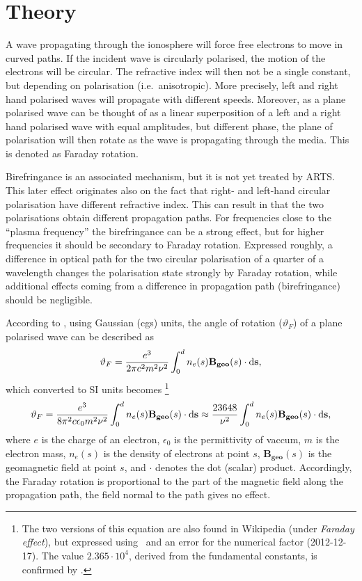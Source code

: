 \section{Theory}
\label{sec:faraday:theory}

A wave propagating through the ionosphere will force free electrons to move in
curved paths. If the incident wave is circularly polarised, the motion of the
electrons will be circular. The refractive index will then not be a single
constant, but depending on polarisation (i.e.\ anisotropic). More precisely,
left and right hand polarised waves will propagate with different speeds.
Moreover, as a plane polarised wave can be thought of as a linear superposition
of a left and a right hand polarised wave with equal amplitudes, but different
phase, the plane of polarisation will then rotate as the wave is propagating
through the media. This is denoted as Faraday rotation.

Birefringance  is an associated mechanism, but it is not
yet treated by ARTS. This later effect originates also on the fact that right-
and left-hand circular polarisation have different refractive index. This can
result in that the two polarisations obtain different propagation paths. For
frequencies close to the ``plasma frequency'' the birefringance can be a strong
effect, but for higher frequencies it should be secondary to Faraday rotation.
Expressed roughly, a difference in optical path for the two circular
polarisation of a quarter of a wavelength changes the polarisation state
strongly by Faraday rotation, while additional effects coming from a difference
in propagation path (birefringance) should be negligible.

According to \citet{rybicki:radia:79}, using Gaussian (cgs) units, the angle of
rotation (\(\vartheta_{F}\)) of a plane polarised wave can be described as
\begin{displaymath}
\vartheta_{F}=
\frac{e^{3}}{2\pi c^2 m^{2}\nu^{2}}
\int_{0}^{d}n_{e}(s) {\bf B_{geo}} (s) \cdot  {\bf \ensuremath{\mathrm{d}}s},  
\end{displaymath}
which converted to SI units becomes \citep{kraus:66}\footnote{The two versions
  of this equation are also found in Wikipedia (under \emph{Faraday effect}),
  but expressed using \Wvl\ and an error for the numerical factor
  (2012-12-17). The value $2.365\cdot10^4$, derived from the fundamental
  constants, is confirmed by \citet{wright:03}.}
\begin{equation}
\vartheta_{F}=\frac{e^{3}}{8\pi^2 c\epsilon_{0}m^{2}\nu^{2}}
\int_{0}^{d}n_{e}(s) {\bf B_{geo}} (s) \cdot  {\bf \ensuremath{\mathrm{d}}s} \approx
\frac{23648}{\nu^2} \int_{0}^{d}n_{e}(s) {\bf B_{geo}} (s) \cdot  {\bf \ensuremath{\mathrm{d}}s},
\end{equation}
where $e$ is the charge of an electron, $\epsilon_{0}$ is the permittivity of
vaccum, $m$ is the electron mass, \(n_{e}(s)\) is the density of electrons at point \(s\),
\(\mathbf{B_{geo}}(s)\) is the geomagnetic field at point \(s\), and \(\cdot\)
denotes the dot (scalar) product. Accordingly, the Faraday rotation is
proportional to the part of the magnetic field along the propagation path,
the field normal to the path gives no effect.

